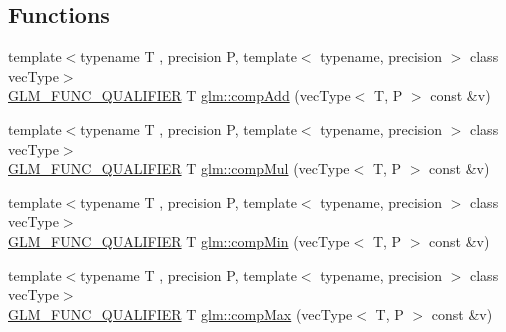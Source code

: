 \subsection*{Functions}
\begin{DoxyCompactItemize}
\item 
{\footnotesize template$<$typename T , precision P, template$<$ typename, precision $>$ class vec\+Type$>$ }\\\hyperlink{setup_8hpp_a33fdea6f91c5f834105f7415e2a64407}{G\+L\+M\+\_\+\+F\+U\+N\+C\+\_\+\+Q\+U\+A\+L\+I\+F\+I\+ER} T \hyperlink{namespaceglm_a766b58e13ddfe3140ce22939887aa954}{glm\+::comp\+Add} (vec\+Type$<$ T, P $>$ const \&v)
\item 
{\footnotesize template$<$typename T , precision P, template$<$ typename, precision $>$ class vec\+Type$>$ }\\\hyperlink{setup_8hpp_a33fdea6f91c5f834105f7415e2a64407}{G\+L\+M\+\_\+\+F\+U\+N\+C\+\_\+\+Q\+U\+A\+L\+I\+F\+I\+ER} T \hyperlink{namespaceglm_a2b7811672b3a9afce8913dae19548b30}{glm\+::comp\+Mul} (vec\+Type$<$ T, P $>$ const \&v)
\item 
{\footnotesize template$<$typename T , precision P, template$<$ typename, precision $>$ class vec\+Type$>$ }\\\hyperlink{setup_8hpp_a33fdea6f91c5f834105f7415e2a64407}{G\+L\+M\+\_\+\+F\+U\+N\+C\+\_\+\+Q\+U\+A\+L\+I\+F\+I\+ER} T \hyperlink{namespaceglm_a1577bdcf5f8b76fb66296ac53fe77fa8}{glm\+::comp\+Min} (vec\+Type$<$ T, P $>$ const \&v)
\item 
{\footnotesize template$<$typename T , precision P, template$<$ typename, precision $>$ class vec\+Type$>$ }\\\hyperlink{setup_8hpp_a33fdea6f91c5f834105f7415e2a64407}{G\+L\+M\+\_\+\+F\+U\+N\+C\+\_\+\+Q\+U\+A\+L\+I\+F\+I\+ER} T \hyperlink{namespaceglm_a6d3b715875f887b364a34a7529c8fc1b}{glm\+::comp\+Max} (vec\+Type$<$ T, P $>$ const \&v)
\end{DoxyCompactItemize}
